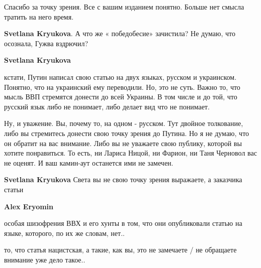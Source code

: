 \begin{itemize}
\begin{itemize}
Спасибо за точку зрения. Все с вашим изданием понятно. Больше нет смысла тратить на него время.

 
\textbf{Svetlana Kryukova}. А что же « победобесие» зачистила? Не думаю, что осознала, Гужва вздрючил?

 
\textbf{Svetlana Kryukova} 

кстати, Путин написал свою статью на двух языках, русском и украинском.
Понятно, что на украинский ему переводили. Но, это не суть. Важно то, что мысль
ВВП стремятся донести до всей Украины. В том числе и до той, что русский язык
либо не понимает, либо делает вид что не понимает. 

Ну, и уважение. Вы, почему то, на одном - русском. Тут двойное толкование, либо
вы стремитесь донести свою точку зрения до Путина. Но я не думаю, что он
обратит на вас внимание. Либо вы не уважаете свою публику, которой вы хотите
понравиться. То есть, ни Лариса Ницой, ни Фарион, ни Таня Черновол вас не
оценят. И ваш камин-аут останется ими не замечен.

 
\textbf{Svetlana Kryukova} Света вы не свою точку зрения выражаете, а заказчика статьи

 
\textbf{Alex Eryomin} 

особая шизофрения ВВХ и его хунты в том, что они опубликовали статью на языке,
которого, по их же словам, нет..

то, что статья нацистская, а такие, как вы, это не замечаете / не обращаете
внимание уже дело такое..



\end{itemize}
\end{itemize}
